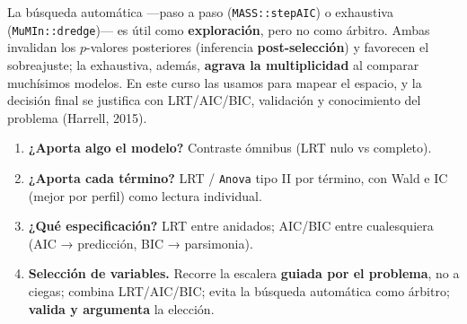 \documentclass[
  letterpaper,
  DIV=11,
  numbers=noendperiod]{scrartcl}
\providecommand{\tightlist}{%
  \setlength{\itemsep}{0pt}\setlength{\parskip}{0pt}}\usepackage{longtable,booktabs,array}
\begin{document}
\begin{tcolorbox}[enhanced jigsaw, breakable, colframe=quarto-callout-warning-color-frame, left=2mm, arc=.35mm, colbacktitle=quarto-callout-warning-color!10!white, toprule=.15mm, colback=white, coltitle=black, rightrule=.15mm, opacitybacktitle=0.6, title=\textcolor{quarto-callout-warning-color}{\faExclamationTriangle}\hspace{0.5em}{Sobre la selección automática (\texttt{step}, \texttt{dredge})}, titlerule=0mm, toptitle=1mm, bottomtitle=1mm, leftrule=.75mm, bottomrule=.15mm, opacityback=0]

La búsqueda automática ---paso a paso (\texttt{MASS::stepAIC}) o
exhaustiva (\texttt{MuMIn::dredge})--- es útil como
\textbf{exploración}, pero no como árbitro. Ambas invalidan los
\(p\)-valores posteriores (inferencia \textbf{post-selección}) y
favorecen el sobreajuste; la exhaustiva, además, \textbf{agrava la
multiplicidad} al comparar muchísimos modelos. En este curso las usamos
para mapear el espacio, y la decisión final se justifica con
LRT/AIC/BIC, validación y conocimiento del problema (Harrell, 2015).

\end{tcolorbox}

\begin{tcolorbox}[enhanced jigsaw, breakable, colframe=quarto-callout-tip-color-frame, left=2mm, arc=.35mm, colbacktitle=quarto-callout-tip-color!10!white, toprule=.15mm, colback=white, coltitle=black, rightrule=.15mm, opacitybacktitle=0.6, title=\textcolor{quarto-callout-tip-color}{\faLightbulb}\hspace{0.5em}{Protocolo de inferencia y selección}, titlerule=0mm, toptitle=1mm, bottomtitle=1mm, leftrule=.75mm, bottomrule=.15mm, opacityback=0]

\begin{enumerate}
\def\labelenumi{\arabic{enumi}.}
\tightlist
\item
  \textbf{¿Aporta algo el modelo?} Contraste ómnibus (LRT nulo vs
  completo).
\item
  \textbf{¿Aporta cada término?} LRT / \texttt{Anova} tipo II por
  término, con Wald e IC (mejor por perfil) como lectura individual.
\item
  \textbf{¿Qué especificación?} LRT entre anidados; AIC/BIC entre
  cualesquiera (AIC → predicción, BIC → parsimonia).
\item
  \textbf{Selección de variables.} Recorre la escalera \textbf{guiada
  por el problema}, no a ciegas; combina LRT/AIC/BIC; evita la búsqueda
  automática como árbitro; \textbf{valida y argumenta} la elección.
\end{enumerate}

\end{tcolorbox}
\end{document}
